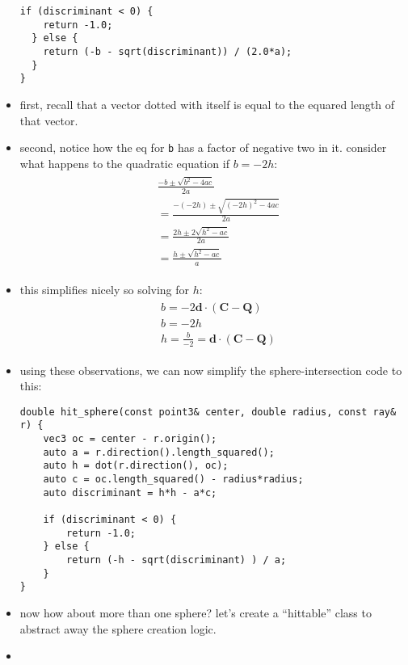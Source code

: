 \begin{itemize}
\begin{lstlisting}[style=rosepinestyle]
  if (discriminant < 0) {
    return -1.0;
  } else {
    return (-b - sqrt(discriminant)) / (2.0*a);
  }
}
\end{lstlisting}
    \item first, recall that a vector dotted with itself is equal to the equared
        length of that vector. 
    \item second, notice how the eq for \texttt{b} has a factor of negative two
        in it. consider what happens to the quadratic equation if $b = -2h:$
        \begin{align*}
            &\begin{array}{c}
                \displaystyle \frac{-b\pm \sqrt{b^{2}-4ac}}{2a} \\[15pt]
                \displaystyle = \frac{-(-2h) \pm \sqrt{(-2h)^{2}-4ac}}{2a} \\[15pt]
                \displaystyle = \frac{2h \pm 2\sqrt{h^{2}-ac}}{2a} \\[15pt]
                \displaystyle = \frac{h \pm \sqrt{h^{2}-ac}}{a} 
            \end{array}
        \end{align*}
    \item this simplifies nicely so solving for $h$:
        \begin{align*}
            &\begin{array}{c}
                \displaystyle b = -2\mathbf{d}\cdot (\mathbf{C}-\mathbf{Q}) \\[15pt] 
                \displaystyle b = -2h \\[15pt] 
                \displaystyle h = \frac{b}{-2} = \mathbf{d}\cdot (\mathbf{C}-\mathbf{Q})
            \end{array}
        \end{align*}
    \item using these observations, we can now simplify the sphere-intersection
        code to this: 
\begin{lstlisting}[style=rosepinestyle]
double hit_sphere(const point3& center, double radius, const ray& r) {
    vec3 oc = center - r.origin();
    auto a = r.direction().length_squared(); 
    auto h = dot(r.direction(), oc);
    auto c = oc.length_squared() - radius*radius;
    auto discriminant = h*h - a*c;

    if (discriminant < 0) {
        return -1.0;
    } else {
        return (-h - sqrt(discriminant) ) / a;
    }
}
\end{lstlisting}
    \item now how about more than one sphere? let's create a ``hittable'' class
        to abstract away the sphere creation logic.
    \item %


\end{itemize}
